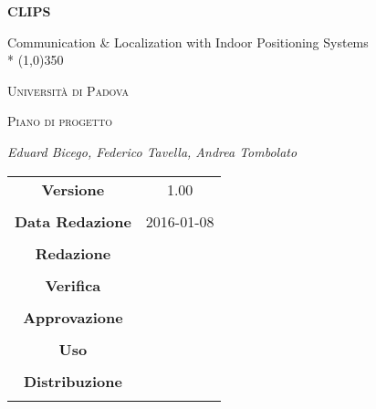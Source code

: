 \documentclass[a4paper,12pt]{article}
\author{Eduard Bicego, Federico Tavella, Andrea Tombolato}
\date{05/01/2016}
\begin{document}
\begin{titlepage}
	\centering
	{\huge\bfseries CLIPS\par}
	Communication \& Localization with Indoor Positioning Systems \\*
	\line(1,0){350} \\
		{\scshape\LARGE Università di Padova \par}
	\vspace{1cm}
		{\scshape\Large Piano di progetto\par}
	\vspace{1.5cm}
		\logo
	\vspace{2cm}
	{\Large\itshape Eduard Bicego, Federico Tavella, Andrea Tombolato\par}
	
	\vfill \vfill
	\begin{tabular}{c|c}
		{\hfill \textbf{Versione}} 			& 1.00				\\ \\
		{\hfill\textbf{Data Redazione}} 	& 2016-01-08  		\\ \\
		{\hfill\textbf{Redazione}} 			&  					\\ \\
		{\hfill\textbf{Verifica}} 			&  					\\ \\
		{\hfill\textbf{Approvazione}} 		&  					\\ \\
		{\hfill\textbf{Uso}} 				& 					\\ \\
		{\hfill\textbf{Distribuzione}} 		& 					\\ \\
	\end{tabular}
\end{titlepage}
	
	\newpage

	\tableofcontents 	%
	\newpage
	\listoftables 		%
	\newpage	
	\listoffigures		%
	
	\label{LastFrontPage}

	\newpage
		\pagestyle{mymain}
	
	\newpage
		
	
	\newpage
		

	\newpage
		
		
	\newpage
			
		
	\newpage
			

    \newpage
		
		
	\newpage
		
        
    \newpage
		
		
	\label{LastPage}
\end{document}
